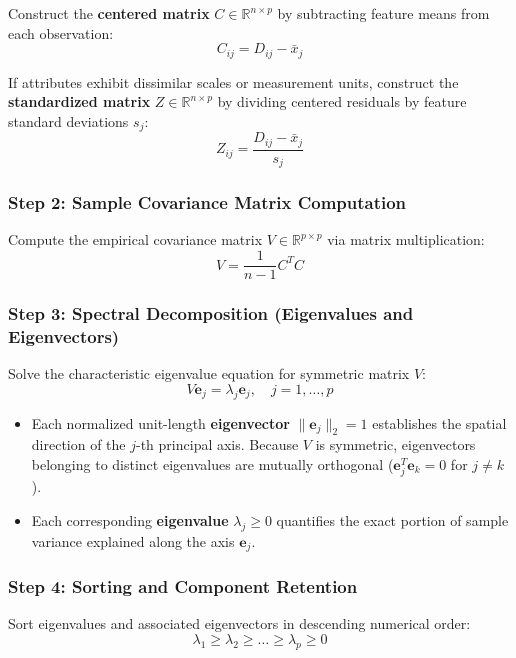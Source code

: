 Construct the \textbf{centered matrix} $C \in \mathbb{R}^{n \times p}$ by subtracting feature means from each observation:
\begin{equation}
    C_{ij} = D_{ij} - \bar{x}_j
\end{equation}

If attributes exhibit dissimilar scales or measurement units, construct the \textbf{standardized matrix} $Z \in \mathbb{R}^{n \times p}$ by dividing centered residuals by feature standard deviations $s_j$:
\begin{equation}
    Z_{ij} = \frac{D_{ij} - \bar{x}_j}{s_j}
\end{equation}

\subsubsection{Step 2: Sample Covariance Matrix Computation}
Compute the empirical covariance matrix $V \in \mathbb{R}^{p \times p}$ via matrix multiplication:
\begin{equation}
    V = \frac{1}{n-1} C^T C
\end{equation}

\subsubsection{Step 3: Spectral Decomposition (Eigenvalues and Eigenvectors)}
Solve the characteristic eigenvalue equation for symmetric matrix $V$:
\begin{equation}
    V \mathbf{e}_j = \lambda_j \mathbf{e}_j, \quad j = 1, \dots, p
\end{equation}
\begin{itemize}[noitemsep]
    \item Each normalized unit-length \textbf{eigenvector} $\|\mathbf{e}_j\|_2 = 1$ establishes the spatial direction of the $j$-th principal axis. Because $V$ is symmetric, eigenvectors belonging to distinct eigenvalues are mutually orthogonal ($\mathbf{e}_j^T \mathbf{e}_k = 0$ for $j \neq k$).
    \item Each corresponding \textbf{eigenvalue} $\lambda_j \ge 0$ quantifies the exact portion of sample variance explained along the axis $\mathbf{e}_j$.
\end{itemize}

\subsubsection{Step 4: Sorting and Component Retention}
Sort eigenvalues and associated eigenvectors in descending numerical order:
\begin{equation}
    \lambda_1 \ge \lambda_2 \ge \dots \ge \lambda_p \ge 0
\end{equation}


